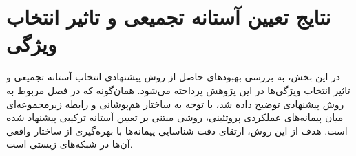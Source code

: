 \section{نتایج تعیین آستانه تجمیعی و تاثیر انتخاب ویژگی}


در این بخش، به بررسی بهبودهای حاصل از روش پیشنهادی انتخاب آستانه تجمیعی و تاثیر انتخاب ویژگی‌ها در این پژوهش پرداخته می‌شود. همان‌گونه که در فصل مربوط به روش پیشنهادی توضیح داده شد، با توجه به ساختار هم‌پوشانی و رابطه زیرمجموعه‌ای میان پیمانه‌های عملکردی پروتئینی، روشی مبتنی بر تعیین آستانه ترکیبی پیشنهاد شده است. هدف از این روش، ارتقای دقت شناسایی پیمانه‌ها با بهره‌گیری از ساختار واقعی آن‌ها در شبکه‌های زیستی است.

\begin{table}[h]
	\centering
	\caption{عملکرد تعیین آستانه تجمیعی و نوع ویژگی‌ها - نتایج مربوط به سایر آستانه‌ها در پیوست موجود است.}
	\vspace{5mm}
	\label{table:merge-thresholds-results}	
\end{table}
